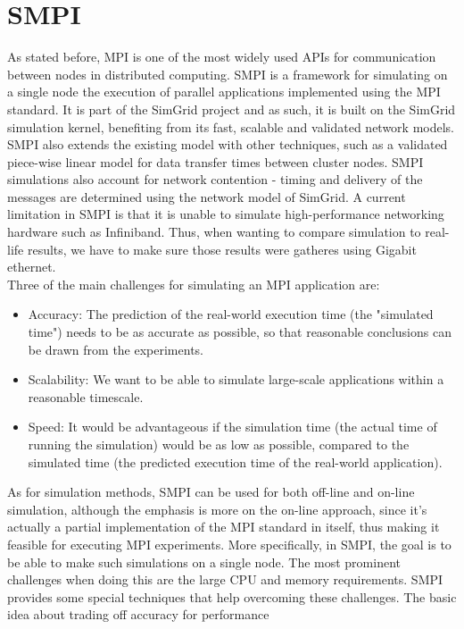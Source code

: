 \section{SMPI}
As stated before, MPI is one of the most widely used APIs for
communication between nodes in distributed computing. SMPI is a
framework for simulating on a single node the execution of parallel
applications implemented using the MPI standard. It is part of the
SimGrid project and as such, it is built on the SimGrid simulation
kernel, benefiting from its fast, scalable and validated network
models. SMPI also extends the existing model with other techniques,
such as a validated piece-wise linear model for data transfer times
between cluster nodes. SMPI simulations also account for network
contention - timing and delivery of the messages are determined using
the network model of SimGrid.\cite{csgscq11} A current limitation in
SMPI is that it is unable to simulate high-performance networking
hardware such as Infiniband. Thus, when wanting to compare simulation
to real-life results, we have to make sure those results were gatheres
using Gigabit ethernet.\\
Three of the main challenges for simulating an MPI application are:
\begin{itemize}
\item Accuracy: The prediction of the real-world execution time (the
  "simulated time") needs to be as accurate as possible, so that
  reasonable conclusions can be drawn from the experiments.
\item Scalability: We want to be able to simulate large-scale
  applications within a reasonable timescale.
\item Speed: It would be advantageous if the simulation time (the
  actual time of running the simulation) would be as low as possible,
  compared to the simulated time (the predicted execution time of the
  real-world application).
\end{itemize}
As for simulation methods, SMPI can be used for both off-line and
on-line simulation, although the emphasis is more on the on-line
approach, since it's actually a partial implementation of the MPI
standard in itself, thus making it feasible for executing MPI
experiments. More specifically, in SMPI, the goal is to be able to
make such simulations on a single node. The most prominent challenges
when doing this are the large CPU and memory requirements. SMPI
provides some special techniques that help overcoming these
challenges. The basic idea about trading off accuracy for performance
